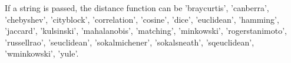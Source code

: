 If a string is passed, the distance function can be 'braycurtis', 'canberra', 'chebyshev', 'cityblock', 'correlation', 'cosine', 'dice', 'euclidean', 'hamming', 'jaccard', 'kulsinski', 'mahalanobis', 'matching', 'minkowski', 'rogerstanimoto', 'russellrao', 'seuclidean', 'sokalmichener', 'sokalsneath', 'sqeuclidean', 'wminkowski', 'yule'.